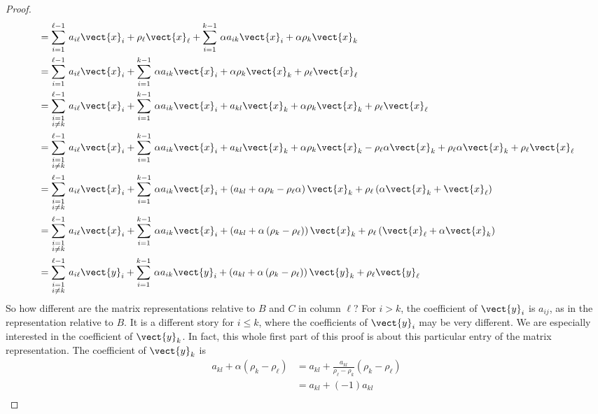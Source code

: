 \begin{proof}
\begin{align*}
%
&=\sum_{i=1}^{\ell-1}\,a_{i\ell}\vect{x}_i + \rho_\ell\vect{x}_\ell+
\sum_{i=1}^{k-1}\,\alpha a_{ik}\vect{x}_i + \alpha\rho_k\vect{x}_k\\
%
&=\sum_{i=1}^{\ell-1}\,a_{i\ell}\vect{x}_i + \sum_{i=1}^{k-1}\,\alpha a_{ik}\vect{x}_i +
 \alpha\rho_k\vect{x}_k + \rho_\ell\vect{x}_\ell\\
%
&=\sum_{\substack{i=1\\i\neq k}}^{\ell-1}\,a_{i\ell}\vect{x}_i + 
\sum_{i=1}^{k-1}\,\alpha a_{ik}\vect{x}_i +
a_{kl}\vect{x}_k + \alpha\rho_k\vect{x}_k + \rho_\ell\vect{x}_\ell\\
%
&=\sum_{\substack{i=1\\i\neq k}}^{\ell-1}\,a_{i\ell}\vect{x}_i + 
\sum_{i=1}^{k-1}\,\alpha a_{ik}\vect{x}_i +
a_{kl}\vect{x}_k + \alpha\rho_k\vect{x}_k - \rho_\ell\alpha\vect{x}_k +  \rho_\ell\alpha\vect{x}_k + \rho_\ell\vect{x}_\ell\\
%
&=\sum_{\substack{i=1\\i\neq k}}^{\ell-1}\,a_{i\ell}\vect{x}_i + 
\sum_{i=1}^{k-1}\,\alpha a_{ik}\vect{x}_i +
\left(a_{kl}+\alpha\rho_k-\rho_\ell\alpha\right)\vect{x}_k +\rho_\ell\left(\alpha\vect{x}_k+\vect{x}_\ell\right)\\
%
&=\sum_{\substack{i=1\\i\neq k}}^{\ell-1}\,a_{i\ell}\vect{x}_i + 
\sum_{i=1}^{k-1}\,\alpha a_{ik}\vect{x}_i +
\left(a_{kl}+\alpha\left(\rho_k-\rho_\ell\right)\right)\vect{x}_k +\rho_\ell\left(\vect{x}_\ell+\alpha\vect{x}_k\right)\\
%
&=\sum_{\substack{i=1\\i\neq k}}^{\ell-1}\,a_{i\ell}\vect{y}_i + 
\sum_{i=1}^{k-1}\,\alpha a_{ik}\vect{y}_i +
\left(a_{kl}+\alpha\left(\rho_k-\rho_\ell\right)\right)\vect{y}_k +\rho_\ell\vect{y}_\ell
%
\end{align*}
%
So how different are the matrix representations relative to $B$ and $C$ in column $\ell$?  For $i>k$, the coefficient of $\vect{y}_i$ is $a_{ij}$, as in the representation relative to $B$.  It is a different story for $i\leq k$, where the coefficients of $\vect{y}_i$ may be very different.  We are especially interested in the coefficient of $\vect{y}_k$.  In fact, this whole first part of this proof is about this particular entry of the matrix representation.  The coefficient of  $\vect{y}_k$ is
%
\begin{align*}
a_{kl}+\alpha\left(\rho_k-\rho_\ell\right)
&=a_{kl}+\frac{a_{kl}}{\rho_\ell-\rho_k}\left(\rho_k-\rho_\ell\right)\\
&=a_{kl}+(-1)a_{kl}\\

\end{align*}
\end{proof}
